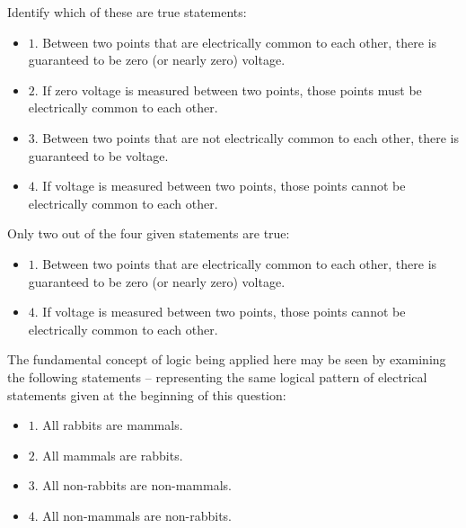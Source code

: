 

Identify which of these are true statements:

\begin{itemize}
\item{$1.$} Between two points that are electrically common to each other, there is guaranteed to be zero (or nearly zero) voltage.
\vskip 10pt
\item{$2.$} If zero voltage is measured between two points, those points must be electrically common to each other.
\vskip 10pt
\item{$3.$} Between two points that are not electrically common to each other, there is guaranteed to be voltage.
\vskip 10pt
\item{$4.$} If voltage is measured between two points, those points cannot be electrically common to each other.
\end{itemize}







Only two out of the four given statements are true:

\begin{itemize}
\item{$1.$} Between two points that are electrically common to each other, there is guaranteed to be zero (or nearly zero) voltage.
\item{$4.$} If voltage is measured between two points, those points cannot be electrically common to each other.
\end{itemize}

The fundamental concept of logic being applied here may be seen by examining the following statements -- representing the same logical pattern of electrical statements given at the beginning of this question:

\begin{itemize}
\item{$1.$} All rabbits are mammals.
\item{$2.$} All mammals are rabbits.
\item{$3.$} All non-rabbits are non-mammals.
\item{$4.$} All non-mammals are non-rabbits.
\end{itemize}

